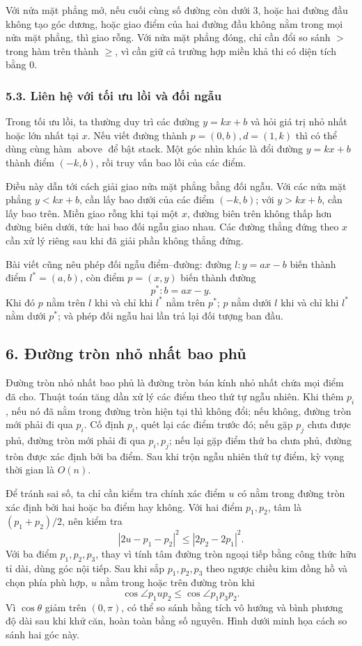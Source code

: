 \documentclass[11pt]{article}
\begin{document}
Với nửa mặt phẳng mở, nếu cuối cùng số đường còn dưới \(3\), hoặc hai đường
đầu không tạo góc dương, hoặc giao điểm của hai đường đầu không nằm trong mọi
nửa mặt phẳng, thì giao rỗng. Với nửa mặt phẳng đóng, chỉ cần đổi so sánh \(>\)
trong hàm trên thành \(\ge\), vì cần giữ cả trường hợp miền khả thi có diện
tích bằng \(0\).

\subsubsection*{5.3. Liên hệ với tối ưu lồi và đối ngẫu}

Trong tối ưu lồi, ta thường duy trì các đường \(y=kx+b\) và hỏi giá trị nhỏ
nhất hoặc lớn nhất tại \(x\). Nếu viết đường thành \(p=(0,b),d=(1,k)\) thì có
thể dùng cùng hàm \(\operatorname{above}\) để bật stack. Một góc nhìn khác là
đổi đường \(y=kx+b\) thành điểm \((-k,b)\), rồi truy vấn bao lồi của các điểm.

Điều này dẫn tới cách giải giao nửa mặt phẳng bằng đối ngẫu. Với các nửa mặt
phẳng \(y<kx+b\), cần lấy bao dưới của các điểm \((-k,b)\); với
\(y>kx+b\), cần lấy bao trên. Miền giao rỗng khi tại một \(x\), đường biên
trên không thấp hơn đường biên dưới, tức hai bao đối ngẫu giao nhau. Các đường
thẳng đứng theo \(x\) cần xử lý riêng sau khi đã giải phần không thẳng đứng.

Bài viết cũng nêu phép đối ngẫu điểm--đường: đường \(l:y=ax-b\) biến thành
điểm \(l^*=(a,b)\), còn điểm \(p=(x,y)\) biến thành đường
\[
  p^*: b=ax-y.
\]
Khi đó \(p\) nằm trên \(l\) khi và chỉ khi \(l^*\) nằm trên \(p^*\); \(p\) nằm
dưới \(l\) khi và chỉ khi \(l^*\) nằm dưới \(p^*\); và phép đối ngẫu hai lần
trả lại đối tượng ban đầu.

\subsection*{6. Đường tròn nhỏ nhất bao phủ}

Đường tròn nhỏ nhất bao phủ là đường tròn bán kính nhỏ nhất chứa mọi điểm đã
cho. Thuật toán tăng dần xử lý các điểm theo thứ tự ngẫu nhiên. Khi thêm
\(p_i\), nếu nó đã nằm trong đường tròn hiện tại thì không đổi; nếu không,
đường tròn mới phải đi qua \(p_i\). Cố định \(p_i\), quét lại các điểm trước
đó; nếu gặp \(p_j\) chưa được phủ, đường tròn mới phải đi qua \(p_i,p_j\);
nếu lại gặp điểm thứ ba chưa phủ, đường tròn được xác định bởi ba điểm. Sau
khi trộn ngẫu nhiên thứ tự điểm, kỳ vọng thời gian là \(O(n)\).

Để tránh sai số, ta chỉ cần kiểm tra chính xác điểm \(u\) có nằm trong đường
tròn xác định bởi hai hoặc ba điểm hay không. Với hai điểm \(p_1,p_2\), tâm là
\((p_1+p_2)/2\), nên kiểm tra
\[
  |2u-p_1-p_2|^2\le |2p_2-2p_1|^2.
\]
Với ba điểm \(p_1,p_2,p_3\), thay vì tính tâm đường tròn ngoại tiếp bằng công
thức hữu tỉ dài, dùng góc nội tiếp. Sau khi sắp \(p_1,p_2,p_3\) theo ngược
chiều kim đồng hồ và chọn phía phù hợp, \(u\) nằm trong hoặc trên đường tròn
khi
\[
  \cos\angle p_1up_2
  \le
  \cos\angle p_1p_3p_2.
\]
Vì \(\cos\theta\) giảm trên \((0,\pi)\), có thể so sánh bằng tích vô hướng và
bình phương độ dài sau khi khử căn, hoàn toàn bằng số nguyên. Hình dưới minh
họa cách so sánh hai góc này.
\end{document}
